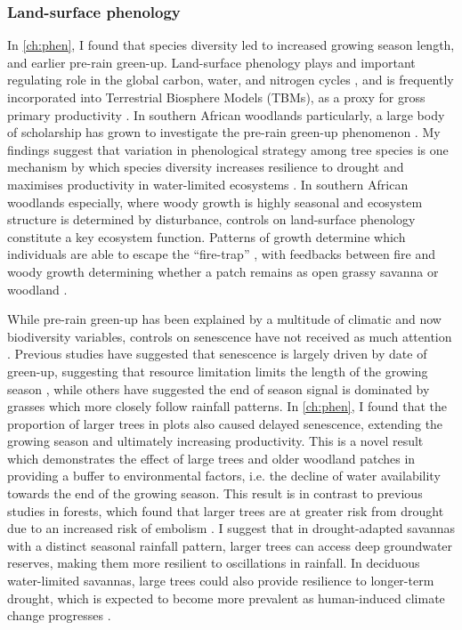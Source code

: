 \begin{refsection}
\subsubsection{Land-surface phenology}
\label{discussion:sssec:phen}

In \autoref{ch:phen}, I found that species diversity led to increased growing season length, and earlier pre-rain green-up. Land-surface phenology plays and important regulating role in the global carbon, water, and nitrogen cycles \citep{Richardson2013}, and is frequently incorporated into Terrestrial Biosphere Models (TBMs), as a proxy for gross primary productivity \citep{Bloom2016}. In southern African woodlands particularly, a large body of scholarship has grown to investigate the pre-rain green-up phenomenon \citep{Ryan2017, Adole2018a}. My findings suggest that variation in phenological strategy among tree species is one mechanism by which species diversity increases resilience to drought and maximises productivity in water-limited ecosystems \citep{Stan2019, Morellato2016}. In southern African woodlands especially, where woody growth is highly seasonal and ecosystem structure is determined by disturbance, controls on land-surface phenology constitute a key ecosystem function. Patterns of growth determine which individuals are able to escape the ``fire-trap'' \citep{Dantas2013}, with feedbacks between fire and woody growth determining whether a patch remains as open grassy savanna or woodland \citep{Staver2011}.

While pre-rain green-up has been explained by a multitude of climatic and now biodiversity variables, controls on senescence have not received as much attention \citep{Gallinat2015}. Previous studies have suggested that senescence is largely driven by date of green-up, suggesting that resource limitation limits the length of the growing season \citep{Zani2020}, while others have suggested the end of season signal is dominated by grasses which more closely follow rainfall patterns. In \autoref{ch:phen}, I found that the proportion of larger trees in plots also caused delayed senescence, extending the growing season and ultimately increasing productivity. This is a novel result which demonstrates the effect of large trees and older woodland patches in providing a buffer to environmental factors, i.e. the decline of water availability towards the end of the growing season. This result is in contrast to previous studies in forests, which found that larger trees are at greater risk from drought due to an increased risk of embolism \citep{Bennett2015}. I suggest that in drought-adapted savannas with a distinct seasonal rainfall pattern, larger trees can access deep groundwater reserves, making them more resilient to oscillations in rainfall. In deciduous water-limited savannas, large trees could also provide resilience to longer-term drought, which is expected to become more prevalent as human-induced climate change progresses \citep{Kusangaya2014}. 


\end{refsection}

